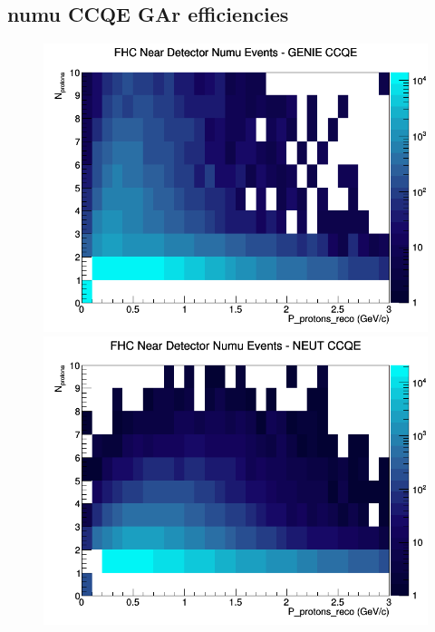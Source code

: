 \documentclass[12pt]{article}
\begin{document}
\subsection{numu CCQE GAr efficiencies}
\begin{figure}[h]
\includegraphics[width=\linewidth]{eff_N_P/GAr/protons/CCQE_FHC_ND_numu_N_P_GENIE.png}
\endminipage
{}
\includegraphics[width=\linewidth]{eff_N_P/GAr/protons/CCQE_FHC_ND_numu_N_P_NEUT.png}
\endminipage
{}

\end{figure}
\end{document}
